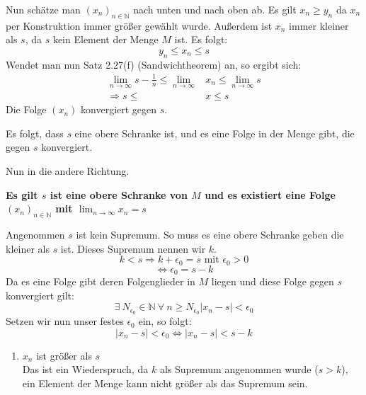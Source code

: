 \documentclass[11pt]{article}
\begin{document}
\begin{enumerate}[ label= (\alph*) ]
\begin{enumerate}[ label = \arabic*. Fall ]
            Nun schätze man \({(x_n)}_{n \in \mathbb{N}}\) nach unten und nach oben ab. Es gilt \(x_n \geq y_n\) da \(x_n\) per Konstruktion immer größer gewählt wurde.
            Außerdem ist \(x_n\) immer kleiner als \(s\), da \(s\) kein Element der Menge \(M\) ist.
            Es folgt:
            \[ y_n \leq x_n \leq s \]
            Wendet man nun Satz 2.27(f) (Sandwichtheorem) an, so ergibt sich:
            \begin{align*}
                \lim_{n \to \infty} s - \frac{1}{n} \leq \lim_{n \to \infty} &x_n \leq \lim_{n \to \infty} s \\
                \Rightarrow s \leq &x \leq s
            \end{align*}
            Die Folge \((x_n)\) konvergiert gegen \(s\).
        \end{enumerate}
        Es folgt, dass \(s\) eine obere Schranke ist, und es eine Folge in der Menge gibt, die gegen \(s\) konvergiert.

        Nun in die andere Richtung.
        \begin{center}
            \textbf{Es gilt \(s\) ist eine obere Schranke von \(M\) und es existiert eine Folge \( {(x_n)}_{n \in \mathbb{N}} \) mit \( \lim_{n \to \infty} x_n = s \) }
        \end{center}
        Angenommen \(s\) ist kein Supremum. So muss es eine obere Schranke geben die kleiner als \(s\) ist. Dieses Supremum nennen wir \(k\).
        \[ k < s \Rightarrow k + \epsilon_0 = s \text{ mit } \epsilon_0 > 0 \]
        \[ \Leftrightarrow \epsilon_0 = s - k\]
        Da es eine Folge gibt deren Folgenglieder in \(M\) liegen und diese Folge gegen \(s\) konvergiert gilt:
        \[ \exists \: N_{\epsilon_0} \in \mathbb{N} \: \forall \: n \geq N_{\epsilon_0}  |x_n - s| < \epsilon_0 \]
        Setzen wir nun unser festes \( \epsilon_0 \) ein, so folgt:
        \[ |x_n - s| < \epsilon_0 \Leftrightarrow |x_n - s| < s - k \]
        
        \begin{enumerate}[ label = \arabic*. Fall ]
            \item \(x_n\) ist größer als \(s\) \\
            Das ist ein Wiederspruch, da \(k\) als Supremum angenommen wurde (\(s > k\)), ein Element der Menge kann nicht größer als das Supremum sein.


\end{enumerate}
\end{enumerate}
\end{document}
